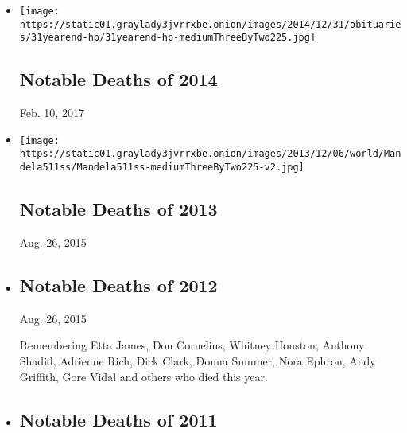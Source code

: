 \begin{itemize}
\item
  \href{https://www.nytimes3xbfgragh.onion/interactive/2014/obituaries/notable-deaths-2014.html}{}

  \texttt{[image: https://static01.graylady3jvrrxbe.onion/images/2014/12/31/obituaries/31yearend-hp/31yearend-hp-mediumThreeByTwo225.jpg]}

  \hypertarget{notable-deaths-of-2014}{%
  \subsection{Notable Deaths of 2014}\label{notable-deaths-of-2014}}

  Feb. 10, 2017
\item
  \href{https://www.nytimes3xbfgragh.onion/interactive/obituaries/notable-deaths-of-2013.html}{}

  \texttt{[image: https://static01.graylady3jvrrxbe.onion/images/2013/12/06/world/Mandela511ss/Mandela511ss-mediumThreeByTwo225-v2.jpg]}

  \hypertarget{notable-deaths-of-2013}{%
  \subsection{Notable Deaths of 2013}\label{notable-deaths-of-2013}}

  Aug. 26, 2015
\item
  \href{https://www.nytimes3xbfgragh.onion/interactive/obituaries/notable-deaths-of-2012.html}{}

  \hypertarget{notable-deaths-of-2012}{%
  \subsection{Notable Deaths of 2012}\label{notable-deaths-of-2012}}

  Aug. 26, 2015

  Remembering Etta James, Don Cornelius, Whitney Houston, Anthony
  Shadid, Adrienne Rich, Dick Clark, Donna Summer, Nora Ephron, Andy
  Griffith, Gore Vidal and others who died this year.
\item
  \href{https://www.nytimes3xbfgragh.onion/interactive/obituaries/2011_notabledeaths.html}{}

  \hypertarget{notable-deaths-of-2011}{%
  \subsection{Notable Deaths of 2011}\label{notable-deaths-of-2011}}


\end{itemize}
